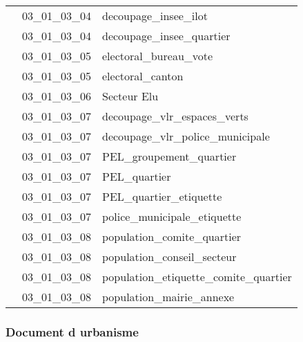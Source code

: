 \documentclass[12pt,titlepage]{book}
\begin{document}
\begin{supertabular}{|p{10cm}|c|p{15cm}|}
                    & 03\_01\_03\_04 & decoupage\_insee\_ilot\\


                    & 03\_01\_03\_04 & decoupage\_insee\_quartier\\


                    & 03\_01\_03\_05 & electoral\_bureau\_vote\\


                    & 03\_01\_03\_05 & electoral\_canton\\


                    & 03\_01\_03\_06 & Secteur Elu\\


                    & 03\_01\_03\_07 & decoupage\_vlr\_espaces\_verts\\


                    & 03\_01\_03\_07 & decoupage\_vlr\_police\_municipale\\


                    & 03\_01\_03\_07 & PEL\_groupement\_quartier\\


                    & 03\_01\_03\_07 & PEL\_quartier\\


                    & 03\_01\_03\_07 & PEL\_quartier\_etiquette\\


                    & 03\_01\_03\_07 & police\_municipale\_etiquette\\


                    & 03\_01\_03\_08 & population\_comite\_quartier\\


                    & 03\_01\_03\_08 & population\_conseil\_secteur\\


                    & 03\_01\_03\_08 & population\_etiquette\_comite\_quartier\\


                    & 03\_01\_03\_08 & population\_mairie\_annexe\\
\hline
\end{supertabular}

\subsubsection{\large Document d urbanisme}
\end{document}
